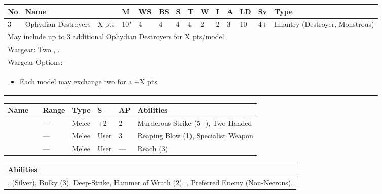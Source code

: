 \noindent
\begin{tabular}{||m{10pt} m{95pt} m{30pt} m{11pt} m{11pt} m{11pt} m{11pt} m{11pt} m{11pt} m{11pt} m{11pt} m{11pt} m{11pt} m{125pt}||}
	\hline
	No & Name & & M & WS & BS & S & T & W & I & A & LD & Sv & Type \\
	\hline
	3 & Ophydian Destroyers & X pts & 10" & 4 & 4 & 4 & 4 & 2 & 2 & 3 & 10 & 4+ & Infantry (Destroyer, Monstrous) \\
	\hline
	\hline
	\multicolumn{14}{||Z{532 pt}||}{May include up to 3 additional Ophydian Destroyers for X pts/model.}\\	
	\hline
	\hline
	\multicolumn{14}{||Z{532 pt}||}{Wargear: Two \quickref{Hyperphase Thresher}, \quickref{Whip Coils}.} \\
	\multicolumn{14}{||Z{532 pt}||}{Wargear Options:} \\	\multicolumn{14}{||Z{532 pt}||}{\begin{itemize}
			\item Each model may exchange two \quickref{Hyperphase Thresher} for a \quickref{Hyperphase Reap-Blade} \hrulefill +X pts
	\end{itemize}} \\
	\hline
\end{tabular}

\noindent
\begin{tabular}{||m{110pt} m{30pt} m{31pt} m{55pt} m{12pt} m{12pt} m{210pt}||}
	\hline
	Name & & Range & Type & S & AP & Abilities \\
	\hline
	\quickref{Hyperphase Reap-Blade} &  & — & Melee & +2 & 2 & Murderous Strike (5+), Two-Handed \\
	\quickref{Hyperphase Thresher} &  & — & Melee & User & 3 & Reaping Blow (1), Specialist Weapon \\
	\quickref{Whip Coils} & & — & Melee & User & — & Reach (3) \\
	\hline
\end{tabular}

\noindent
\begin{tabular}{||m{532pt}||}
	\hline
	Abilities \\
	\hline
	\quickref{Annihilation Protocols}, \quickref{Awakening Protocols} (Silver), Bulky (3), Deep-Strike, Hammer of Wrath (2), \quickref{Living Metal}, Preferred Enemy (Non-Necrons), \quickref{Reanimation Protocols} \\
	\hline
\end{tabular}



\newpage
